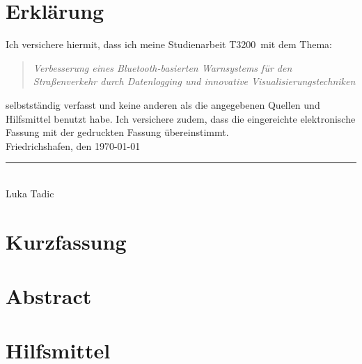 \documentclass[a4paper, 12pt]{article} %
\newcommand{\titel}{Verbesserung eines Bluetooth-basierten Warnsystems für den Straßenverkehr durch Datenlogging und innovative Visualisierungstechniken}
\newcommand{\arbeit}{Studienarbeit T3200}
\newcommand{\autor}{Luka Tadic}
\begin{document}
\begin{titlepage}
\end{titlepage}

\clearpage

\pagestyle{scrheadings}  %
\hypersetup{pageanchor=true}



\section*{Erklärung}

Ich versichere hiermit, dass ich meine \arbeit\ mit dem Thema:

\begin{quote}
    \textit{\titel}
\end{quote}

selbstständig verfasst und keine anderen als die angegebenen Quellen und Hilfsmittel benutzt habe.  
Ich versichere zudem, dass die eingereichte elektronische Fassung mit der gedruckten Fassung übereinstimmt.\\[6ex]

Friedrichshafen, den \today \\[1ex]
\rule[-0.2cm]{5cm}{0.5pt} \\  
\autor \\[10ex]

\rmfamily


\clearpage

\section*{Kurzfassung}
  
\section*{Abstract}
\clearpage

\section*{Hilfsmittel}

\clearpage
\listoffigures
\end{document}
